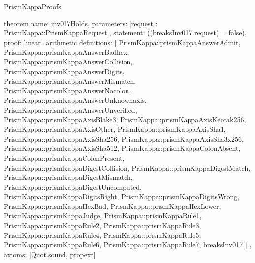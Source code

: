\begin{lexlean}{PrismKappaProofs}
\begin{semanticmodule}
theorem{
  name: inv017Holds,
  parameters: [request : PrismKappa::PrismKappaRequest],
  statement: ((breaksInv017 request) = false),
  proof: linear_arithmetic{
    definitions: [
      PrismKappa::prismKappaAnswerAdmit,
      PrismKappa::prismKappaAnswerBadhex,
      PrismKappa::prismKappaAnswerCollision,
      PrismKappa::prismKappaAnswerDigits,
      PrismKappa::prismKappaAnswerMismatch,
      PrismKappa::prismKappaAnswerNocolon,
      PrismKappa::prismKappaAnswerUnknownaxis,
      PrismKappa::prismKappaAnswerUnverified,
      PrismKappa::prismKappaAxisBlake3,
      PrismKappa::prismKappaAxisKeccak256,
      PrismKappa::prismKappaAxisOther,
      PrismKappa::prismKappaAxisSha1,
      PrismKappa::prismKappaAxisSha256,
      PrismKappa::prismKappaAxisSha3x256,
      PrismKappa::prismKappaAxisSha512,
      PrismKappa::prismKappaColonAbsent,
      PrismKappa::prismKappaColonPresent,
      PrismKappa::prismKappaDigestCollision,
      PrismKappa::prismKappaDigestMatch,
      PrismKappa::prismKappaDigestMismatch,
      PrismKappa::prismKappaDigestUncomputed,
      PrismKappa::prismKappaDigitsRight,
      PrismKappa::prismKappaDigitsWrong,
      PrismKappa::prismKappaHexBad,
      PrismKappa::prismKappaHexLower,
      PrismKappa::prismKappaJudge,
      PrismKappa::prismKappaRule1,
      PrismKappa::prismKappaRule2,
      PrismKappa::prismKappaRule3,
      PrismKappa::prismKappaRule4,
      PrismKappa::prismKappaRule5,
      PrismKappa::prismKappaRule6,
      PrismKappa::prismKappaRule7,
      breaksInv017
    ]
  },
  axioms: [Quot.sound, propext]
}
\end{semanticmodule}
\end{lexlean}
